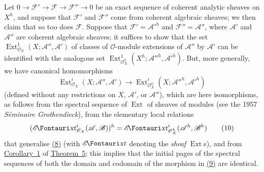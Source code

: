 \documentclass{article}
\newcommand{\scr}[1]{{\mathscr{#1}}}
\newcommand{\shExt}{\scr{E}\textup{\kern-2.2pt{\Fontauri\slshape xt}}}
\newcommand{\Ext}{\operatorname{Ext}}
\begin{document}
Let $0\to\scr{F}'\to\scr{F}\to\scr{F}''\to0$ be an exact sequence of coherent analytic sheaves on $X^h$, and suppose that $\scr{F}'$ and $\scr{F}''$ come from coherent algebraic sheaves;
we then claim that so too does $\scr{F}$.
Suppose that $\scr{F}'=\scr{A}'^h$ and $\scr{F}''=\scr{A}''$, where $\scr{A}'$ and $\scr{A}''$ are coherent algebraic sheaves;
it suffices to show that the set $\Ext_{\scr{O}_X}^1(X;\scr{A}'',\scr{A}')$ of classes of $\scr{O}$-module extensions of $\scr{A}''$ by $\scr{A}'$ can be identified with the analogous set $\Ext_{\scr{O}_X^h}^1(X^h;\scr{A}''^h,\scr{A}'^h)$.
But, more generally, we have canonical homomorphisms
\[
\label{equation9}
  \Ext_{\scr{O}_X}^i(X;\scr{A}'',\scr{A}')
  \to 
  \Ext_{\scr{O}_X^h}^i(X;\scr{A}''^h,\scr{A}'^h)
  \tag{9}
\]
(defined without any restrictions on $X$, $\scr{A}'$, or $\scr{A}''$), which are here isomorphisms, as follows from the spectral sequence of $\Ext$ of sheaves of modules (see the 1957 \emph{S\'{e}minaire Grothendieck}), from the elementary local relations
\[
\label{equation10}
  (\shExt_{\scr{O}_X}^i(\scr{A},\scr{B}))^h
  = \shExt_{\scr{O}_X^h}^i(\scr{A}^h,\scr{B}^h)
  \tag{10}
\]
that generalise \hyperref[equation8]{(8)} (with $\shExt$ denoting the \emph{sheaf} $\Ext$s), and from \hyperref[corollary1-5]{Corollary~1} of \hyperref[theorem5]{Theorem~5};
this implies that the initial pages of the spectral sequences of both the domain and codomain of the morphism in \hyperref[equation9]{(9)} are identical.
\end{document}
